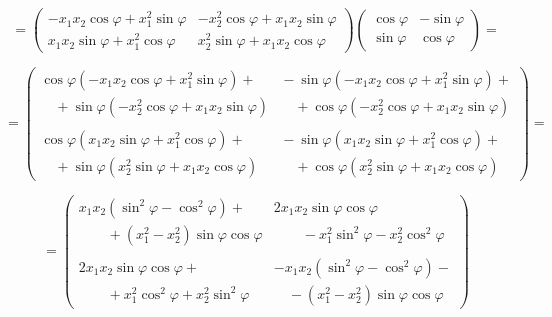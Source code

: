 {\smallskip

$$
  =\left(
    \begin{array}{cc}
      -x_1 x_2 \cos \varphi + x_1^2 \sin \varphi &
        -x_2^2 \cos \varphi + x_1 x_2 \sin \varphi \\
      x_1 x_2 \sin \varphi + x_1^2 \cos \varphi &
        x_2^2 \sin \varphi + x_1 x_2 \cos \varphi
    \end{array}
  \right)
  \left(
    \begin{array}{cc}
      \cos \varphi  & -\sin \varphi \\
      \sin \varphi & \cos \varphi
    \end{array}
  \right)=
$$

\smallskip

$$
  =\left(\!\!\!
    \begin{array}{cc}
      \cos \varphi
        \left(-x_1 x_2 \cos \varphi + x_1^2 \sin \varphi\right)+\!&\!
      -\sin \varphi
        \left(-x_1 x_2 \cos \varphi + x_1^2 \sin \varphi\right)+\\
      \quad +\sin \varphi
        \left(-x_2^2 \cos \varphi + x_1 x_2 \sin \varphi\right)\!&\!
      \quad +\cos \varphi
        \left(-x_2^2 \cos \varphi + x_1 x_2 \sin \varphi\right)\\
      \\[1ex]
      \cos \varphi
        \left(x_1 x_2 \sin \varphi + x_1^2 \cos \varphi\right)+\!&\!
      -\sin \varphi
        \left(x_1 x_2 \sin \varphi + x_1^2 \cos \varphi\right)+\\
      \quad +\sin \varphi
        \left(x_2^2 \sin \varphi + x_1 x_2 \cos \varphi\right)\!&\!
      \quad +\cos \varphi
        \left(x_2^2 \sin \varphi + x_1 x_2 \cos \varphi\right)
    \end{array}
  \!\right)=
$$

\smallskip

$$
  =\left(
    \begin{array}{cc}
      x_1 x_2 \left(\sin^2 \varphi - \cos^2 \varphi \right) + &
      2x_1 x_2 \sin \varphi \cos \varphi \\
      \qquad + \left( x_1^2-x_2^2 \right) \sin \varphi \cos \varphi &
      \qquad - x_1^2 \sin^2 \varphi - x_2^2 \cos^2 \varphi \\
      \\[1ex]
      2x_1 x_2 \sin \varphi \cos \varphi + &
      -x_1 x_2 \left(\sin^2 \varphi - \cos^2 \varphi \right) - \\
      \qquad + x_1^2 \cos^2 \varphi + x_2^2 \sin^2 \varphi &
      \quad -\left(x_1^2-x_2^2\right) \sin \varphi \cos \varphi
    \end{array}
  \right)
$$

}
